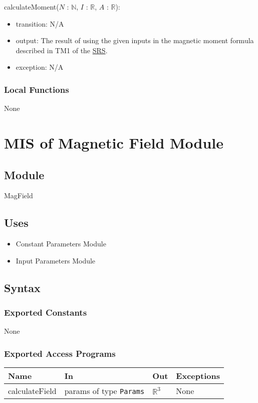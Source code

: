 \documentclass[12pt, titlepage]{article}
\begin{document}
\noindent calculateMoment($N$ : $\mathbb{N}$, $I$ : $\mathbb{R}$, $A$ : $\mathbb{R}$):
\begin{itemize}
\item transition: N/A
\item output: The result of using the given inputs in the magnetic moment formula described in TM1 of the \href{https://github.com/husseinsd1/optimal-em-arrangement/blob/main/docs/SRS/SRS.pdf}{SRS}.
\item exception: N/A
\end{itemize}

\subsubsection{Local Functions}
None

\newpage

\section{MIS of Magnetic Field Module} \label{MISMagField}
\subsection{Module}
MagField

\subsection{Uses}
\begin{itemize}
  \item Constant Parameters Module
  \item Input Parameters Module
\end{itemize}

\subsection{Syntax}

\subsubsection{Exported Constants}
None

\subsubsection{Exported Access Programs}
\begin{center}
\begin{tabular}{p{3cm} p{4cm} p{4cm} p{3cm}}
\hline
\textbf{Name} & \textbf{In} & \textbf{Out} & \textbf{Exceptions} \\
\hline
calculateField & params of type \texttt{Params} & $\mathbb{R}^3$ & None \\
\hline
\end{tabular}
\end{center}
\end{document}

